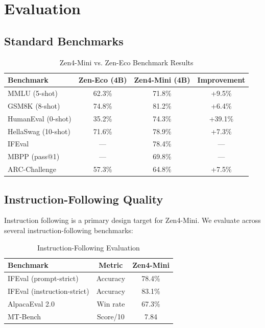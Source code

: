 \documentclass[11pt,a4paper]{article}
\begin{document}
\section{Evaluation}

\subsection{Standard Benchmarks}

\begin{table}[H]
\centering
\begin{tabular}{lccc}
\toprule
\textbf{Benchmark} & \textbf{Zen-Eco (4B)} & \textbf{Zen4-Mini (4B)} & \textbf{Improvement} \\
\midrule
MMLU (5-shot)       & 62.3\% & 71.8\% & +9.5\% \\
GSM8K (8-shot)      & 74.8\% & 81.2\% & +6.4\% \\
HumanEval (0-shot)  & 35.2\% & 74.3\% & +39.1\% \\
HellaSwag (10-shot) & 71.6\% & 78.9\% & +7.3\% \\
IFEval              & ---    & 78.4\% & --- \\
MBPP (pass@1)       & ---    & 69.8\% & --- \\
ARC-Challenge       & 57.3\% & 64.8\% & +7.5\% \\
\bottomrule
\end{tabular}
\caption{Zen4-Mini vs. Zen-Eco Benchmark Results}
\end{table}

\subsection{Instruction-Following Quality}

Instruction following is a primary design target for Zen4-Mini. We evaluate across
several instruction-following benchmarks:

\begin{table}[H]
\centering
\begin{tabular}{lcc}
\toprule
\textbf{Benchmark} & \textbf{Metric} & \textbf{Zen4-Mini} \\
\midrule
IFEval (prompt-strict)   & Accuracy & 78.4\% \\
IFEval (instruction-strict) & Accuracy & 83.1\% \\
AlpacaEval 2.0           & Win rate & 67.3\% \\
MT-Bench                 & Score/10 & 7.84 \\
\bottomrule
\end{tabular}
\caption{Instruction-Following Evaluation}
\end{table}
\end{document}
